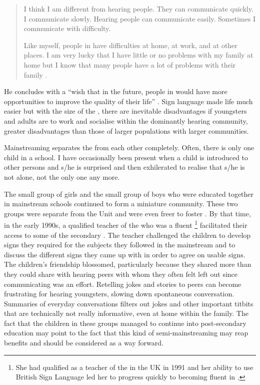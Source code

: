 \documentclass[output=paper]{langsci/langscibook}
\begin{document}
\begin{quote}
I think I am different from hearing people.  They can communicate
quickly.  I communicate slowly.  Hearing people can communicate
easily. Sometimes I communicate with difficulty.

Like myself,  people in  have difficulties at home, at work,
and at other places.  I am very lucky that I have little or no
problems with my family at home but I know that many  people have
a lot of problems with their family \citep[41]{bk91}.
\end{quote}

He concludes with a “wish that in the future,  people in 
would have more opportunities to improve the quality of their life”
\citep[43]{bk91}. Sign language made life much easier but
with the size of the  , there are inevitable
disadvantages if  youngsters and adults are to work and socialise
within the dominantly hearing community, greater disadvantages than
those of larger populations with larger  communities.

Mainstreaming separates the  from each other completely.  Often,
there is only one  child in a school. I have occasionally been
present when a  child is introduced to other  persons and s/he
is surprised and then exhilerated to realise that s/he is not alone,
not the only  one any more.

The small group of girls and the small group of boys who were educated
together in mainstream schools continued to form a miniature
community. These two groups were separate from the  Unit and were
even freer to foster .  By that time, in the early 1990s,
a qualified teacher of the  who was a fluent \footnote{She
  had qualified as a teacher of the  in the UK in 1991 and her
  ability to use British Sign Language led her to progress quickly to
  becoming fluent in .} facilitated their access
to some of the secondary .  The teacher challenged
the children to develop signs they required for the subjects they
followed in the mainstream and to discuss the different signs they
came up with in order to agree on usable signs.  The children’s
friendship blossomed, particularly because they shared more than they
could share with hearing peers with whom they often felt left out
since communicating was an effort. Retelling jokes and stories to 
peers can become frustrating for hearing youngsters, slowing down
spontaneous conversation.  Summaries of everyday conversations filters
out jokes and other important titbits that are technically not really
informative, even at home within the family.  The fact that the
children in these groups managed to continue into post-secondary
education may point to the fact that this kind of semi-mainstreaming
may reap benefits and should be considered as a way forward.
\end{document}
